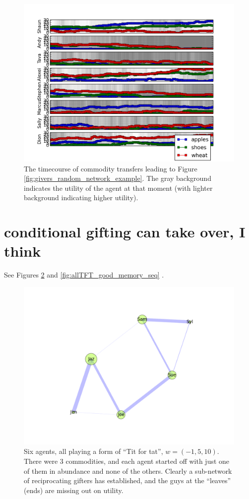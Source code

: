 \documentclass[11pt]{article}
\begin{document}
\begin{figure}[b]
\includegraphics[width=\textwidth]{givers_random_network_example_seq}
\caption{\label{fig:givers_random_network_seq} 
The timecourse of commodity transfers leading to Figure \ref{fig:givers_random_network_example}. The gray background indicates the utility of the agent at that moment (with lighter background indicating higher utility). }\end{figure}


\section{conditional gifting can take over, I think}

See Figures \ref{fig:allTFT_good_memory_result}  and \ref{fig:allTFT_good_memory_seq} .

\begin{figure}[b]
\includegraphics[width=.85\textwidth]{allTFT_good_memory_result}
\caption{\label{fig:allTFT_good_memory_result} 
Six agents, all playing a form of ``Tit for tat'', $w=(-1,5,10)$. There were 3 commodities, and each agent started off with just one of them in abundance and none of the others. Clearly a sub-network of reciprocating gifters has established, and the guys at the ``leaves'' (ends) are missing out on utility. }
\end{figure}
\end{document}
